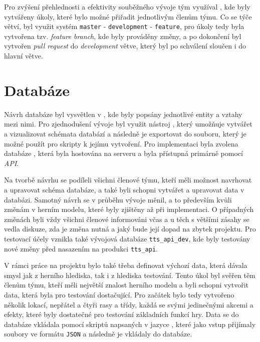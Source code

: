 Pro zvýšení přehlednosti a efektivity souběžného vývoje tým využíval , kde byly vytvářeny úkoly, které bylo možné přiřadit jednotlivým členům týmu. Co se týče větví, byl využit systém \texttt{master} - \texttt{development} - \texttt{feature}, pro úkoly tedy byla vytvořena tzv. \textit{feature branch}, kde byly prováděny změny, a po dokončení byl vytvořen \textit{pull request} do \textit{development} větve, který byl po schválení sloučen i do hlavní větve.

\section{Databáze}
\label{subsec:database}

Návrh databáze byl vysvětlen v , kde byly popsány jednotlivé entity a vztahy mezi nimi. Pro zjednodušení vývoje byl využit nástroj , který umožňuje vytvářet a vizualizovat schémata databází a následně je exportovat do souboru, který je možné použít pro skripty k jejímu vytvoření. Pro implementaci byla zvolena databáze , která byla hostována na serveru a byla přístupná primárně pomocí \textit{API}.

Na tvorbě návrhu se podíleli všichni členové týmu, kteří měli možnost navrhovat a upravovat schéma databáze, a také byli schopni vytvářet a upravovat data v databázi. Samotný návrh se v průběhu vývoje měnil, a to především kvůli změnám v herním modelu, které byly zjištěny až při implementaci. O případných změnách byli vždy všichni členové informováni včas a u těch s většími zásahy se vedla diskuze, zda je změna nutná a jaký bude její dopad na zbytek projektu. Pro testovací účely vznikla také vývojová databáze \texttt{tts\_api\_dev}, kde byly testovány nové změny před nasazením na produkci \texttt{tts\_api}.

V rámci práce na projektu bylo také třeba definovat výchozí data, která dávala smysl jak z herního hlediska, tak i z hlediska testování. Tento úkol byl svěřen těm členům týmu, kteří měli největší znalost herního modelu a byli schopni vytvořit data, která byla pro testování dostačující. Pro začátek bylo tedy vytvořeno několik lokací, nepřátel a čtyři rasy a třídy, každá se svými jedinečnými akcemi a efekty, které byly dostatečné pro testování základních funkcí hry. Data se do databáze vkládala pomocí skriptů napsaných v jazyce , které jako vstup přijímaly soubory ve formátu \texttt{JSON} a následně je vkládaly do databáze.

